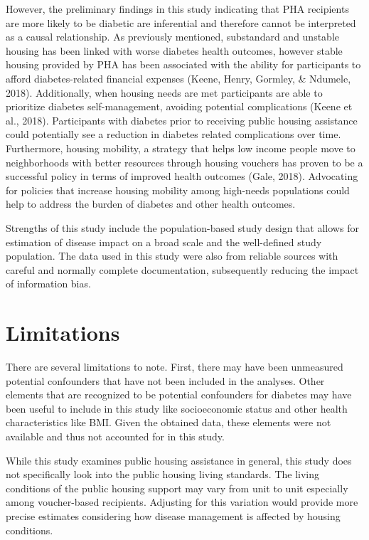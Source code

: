 \documentclass [11pt, proquest] {uwthesis}[2015/03/03]
\begin{document}
However, the preliminary findings in this study indicating that PHA
recipients are more likely to be diabetic are inferential and therefore
cannot be interpreted as a causal relationship. As previously mentioned,
substandard and unstable housing has been linked with worse diabetes
health outcomes, however stable housing provided by PHA has been
associated with the ability for participants to afford diabetes-related
financial expenses (Keene, Henry, Gormley, \& Ndumele, 2018).
Additionally, when housing needs are met participants are able to
prioritize diabetes self-management, avoiding potential complications
(Keene et al., 2018). Participants with diabetes prior to receiving
public housing assistance could potentially see a reduction in diabetes
related complications over time. Furthermore, housing mobility, a
strategy that helps low income people move to neighborhoods with better
resources through housing vouchers has proven to be a successful policy
in terms of improved health outcomes (Gale, 2018). Advocating for
policies that increase housing mobility among high-needs populations
could help to address the burden of diabetes and other health outcomes.

Strengths of this study include the population-based study design that
allows for estimation of disease impact on a broad scale and the
well-defined study population. The data used in this study were also
from reliable sources with careful and normally complete documentation,
subsequently reducing the impact of information bias.

\section{Limitations}\label{limitations}

There are several limitations to note. First, there may have been
unmeasured potential confounders that have not been included in the
analyses. Other elements that are recognized to be potential confounders
for diabetes may have been useful to include in this study like
socioeconomic status and other health characteristics like BMI. Given
the obtained data, these elements were not available and thus not
accounted for in this study.

While this study examines public housing assistance in general, this
study does not specifically look into the public housing living
standards. The living conditions of the public housing support may vary
from unit to unit especially among voucher-based recipients. Adjusting
for this variation would provide more precise estimates considering how
disease management is affected by housing conditions.
\end{document}
